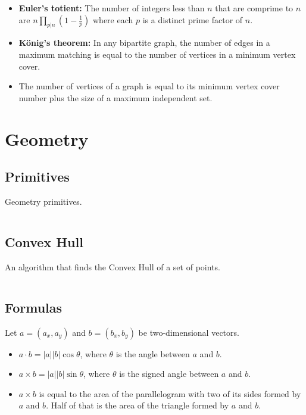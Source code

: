 \documentclass[9pt,a4paper]{amsart}
\newcommand{\code}[1]{\inputminted[linenos]{cpp}{_code/#1}}
\begin{document}
\begin{itemize}
            \item \textbf{Euler's totient:} The number of integers less than
                $n$ that are comprime to $n$ are $n\prod_{p|n}\left(1 - \frac{1}{p}\right)$
                where each $p$ is a distinct prime factor of $n$.
            \item \textbf{König's theorem:} In any bipartite graph, the number
                of edges in a maximum matching is equal to the number of
                vertices in a minimum vertex cover.
            \item The number of vertices of a graph is equal to its minimum
                vertex cover number plus the size of a maximum independent set.
        \end{itemize}


\section{Geometry}
    \subsection{Primitives}
        Geometry primitives.
        \code{geometry/primitives.cpp}

    \subsection{Convex Hull}
        An algorithm that finds the Convex Hull of a set of points.
        \code{geometry/convex_hull.cpp}

    \subsection{Formulas}
        Let $a = (a_x, a_y)$ and $b = (b_x, b_y)$ be two-dimensional vectors.
        \begin{itemize}
            \item $a\cdot b = |a||b|\cos{\theta}$, where $\theta$ is the angle
                between $a$ and $b$.
            \item $a\times b = |a||b|\sin{\theta}$, where $\theta$ is the
                signed angle between $a$ and $b$.
            \item $a\times b$ is equal to the area of the parallelogram with
                two of its sides formed by $a$ and $b$. Half of that is the
                area of the triangle formed by $a$ and $b$.
        \end{itemize}
\end{document}
